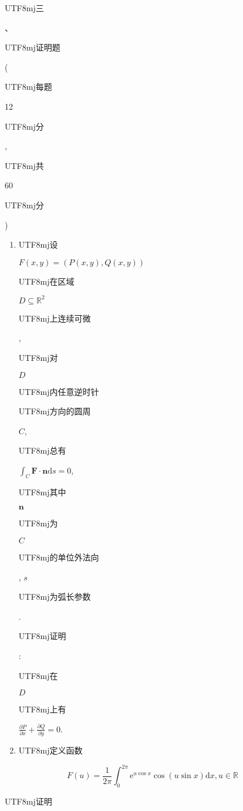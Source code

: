 \documentclass[10pt]{article}
\begin{document}
\begin{CJK}{UTF8}{mj}三\end{CJK}、\begin{CJK}{UTF8}{mj}证明题\end{CJK} (\begin{CJK}{UTF8}{mj}每题\end{CJK} 12 \begin{CJK}{UTF8}{mj}分\end{CJK}, \begin{CJK}{UTF8}{mj}共\end{CJK} 60 \begin{CJK}{UTF8}{mj}分\end{CJK})

\begin{enumerate}
  \item \begin{CJK}{UTF8}{mj}设\end{CJK} $F(x, y)=(P(x, y), Q(x, y))$ \begin{CJK}{UTF8}{mj}在区域\end{CJK} $D \subseteq \mathbb{R}^{2}$ \begin{CJK}{UTF8}{mj}上连续可微\end{CJK}, \begin{CJK}{UTF8}{mj}对\end{CJK} $D$ \begin{CJK}{UTF8}{mj}内任意逆时针\end{CJK} \begin{CJK}{UTF8}{mj}方向的圆周\end{CJK} $C$, \begin{CJK}{UTF8}{mj}总有\end{CJK} $\int_{C} \boldsymbol{F} \cdot \boldsymbol{n} \mathrm{d} s=0$, \begin{CJK}{UTF8}{mj}其中\end{CJK} $\boldsymbol{n}$ \begin{CJK}{UTF8}{mj}为\end{CJK} $C$ \begin{CJK}{UTF8}{mj}的单位外法向\end{CJK}, $s$ \begin{CJK}{UTF8}{mj}为弧长参数\end{CJK}. \begin{CJK}{UTF8}{mj}证明\end{CJK}: \begin{CJK}{UTF8}{mj}在\end{CJK} $D$ \begin{CJK}{UTF8}{mj}上有\end{CJK} $\frac{\partial P}{\partial x}+\frac{\partial Q}{\partial y}=0$.

  \item \begin{CJK}{UTF8}{mj}定义函数\end{CJK}

\end{enumerate}
$$
F(u)=\frac{1}{2 \pi} \int_{0}^{2 \pi} \mathrm{e}^{u \cos x} \cos (u \sin x) \mathrm{d} x, u \in \mathbb{R}
$$
\begin{CJK}{UTF8}{mj}证明\end{CJK}
\end{document}
